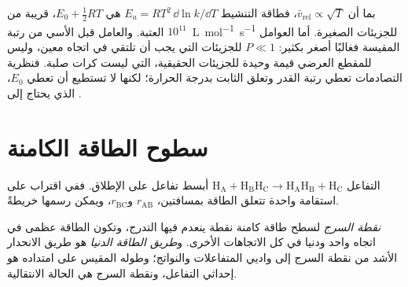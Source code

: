 بما أن $\bar v_{\mathrm{rel}} \propto \sqrt T$، فطاقة التنشيط $E_a = RT^2\,\dd\ln k/\dd T$ هي $E_0 + \frac12RT$،
قريبة من العتبة. والعامل قبل الأسي من رتبة
$10^{11}$~\unit{L.mol^{-1}.s^{-1}} للجزيئات الصغيرة. أما العوامل المقيسة فغالبًا
أصغر بكثير: $P \ll 1$ للجزيئات التي يجب أن تلتقي في
اتجاه معين، وليس للمقطع العرضي قيمة وحيدة للجزيئات الحقيقية،
التي ليست كرات صلبة. فنظرية التصادمات تعطي رتبة القدر 
وتعلق الثابت بدرجة الحرارة؛ لكنها لا تستطيع أن تعطي $E_0$، الذي يحتاج إلى .

\section{سطوح الطاقة الكامنة}

التفاعل $\mathrm{H_A + H_BH_C \to H_AH_B + H_C}$ أبسط تفاعل على الإطلاق. ففي
اقتراب على استقامة واحدة تتعلق الطاقة بمسافتين، $r_{\mathrm{AB}}$ و$r_{\mathrm{BC}}$، ويمكن رسمها
خريطةً.

\begin{definition}\label{def:b3:rate-theories:saddle}
\emph{نقطة السرج} لسطح طاقة كامنة نقطة
ينعدم فيها التدرج، وتكون الطاقة عظمى في اتجاه واحد 
ودنيا في كل الاتجاهات الأخرى. و\emph{طريق الطاقة الدنيا}
هو طريق الانحدار الأشد من نقطة السرج إلى واديي المتفاعلات
والنواتج؛ وطوله المقيس على امتداده هو إحداثي التفاعل،
ونقطة السرج هي الحالة الانتقالية.
\end{definition}

